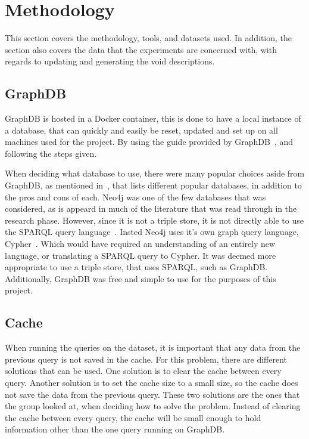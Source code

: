 \section{Methodology}\label{sec:methodology}

This section covers the methodology, tools, and datasets used. In addition, the section also covers the data that the experiments are concerned with, with regards to updating and generating the void descriptions.

\subsection{GraphDB}\label{sec:graphdb}
GraphDB is hosted in a Docker container, this is done to have a local instance of a database, that can quickly and easily be reset, updated and set up on all machines used for the project. By using the guide provided by GraphDB~\cite{docker-graphDB}, and following the steps given.

When deciding what database to use, there were many popular choices aside from GraphDB, as mentioned in~\cite{best-graph-databases}, that lists different popular databases, in addition to the pros and cons of each. Neo4j was one of the few databases that was considered, as is appeard in much of the literature that was read through in the research phase. However, since it is not a triple store, it is not directly able to use the SPARQL query language~\cite{neo4j:-a-reasonable-RDF-graph-database}. Insted Neo4j uses it's own graph query language, Cypher~\cite{cypher-query-language}. Which would have required an understanding of an entirely new language, or translating a SPARQL query to Cypher. It was deemed more appropriate to use a triple store, that uses SPARQL, such as GraphDB. Additionally, GraphDB was free and simple to use for the purposes of this project.

\subsection{Cache}\label{sec:cache}
When running the queries on the dataset, it is important that any data from the previous query is not saved in the cache. For this problem, there are different solutions that can be used. One solution is to clear the cache between every query. Another solution is to set the cache size to a small size, so the cache does not save the data from the previous query. These two solutions are the ones that the group looked at, when deciding how to solve the problem. Instead of clearing the cache between every query, the cache will be small enough to hold information other than the one query running on GraphDB.

